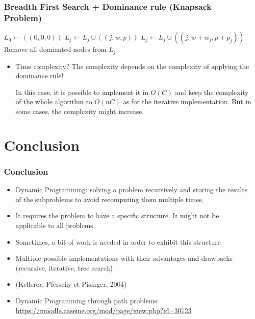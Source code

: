 \documentclass{beamer}
\begin{document}
\begin{frame}
  \frametitle{Breadth First Search + Dominance rule (Knapsack Problem)}

  \begin{algorithmic}
    \State $L_0 \gets ((0, 0, 0))$
    \State $L_j \gets L_j \cup ((j, w, p)) $
    \State $L_j \gets L_j \cup ((j, w + w_j, p + p_j))$
    \EndIf
    \EndFor
    \State \alert{Remove all dominated nodes from $L_j$}
    \EndFor
    \EndProcedure
  \end{algorithmic}

  \begin{itemize}
    \item \pause Time complexity? \pause The complexity depends on the complexity of applying the dominance rule!

  In this case, it is possible to implement it in $O(C)$ and keep the complexity of the whole algorithm to $O(nC)$ as for the iterative implementation. But in some cases, the complexity might increase.
  \end{itemize}
\end{frame}

\section{Conclusion}

\begin{frame}
  \frametitle{Conclusion}

  \begin{itemize}
    \item Dynamic Programming: solving a problem recursively and storing the results of the subproblems to avoid recomputing them multiple times.
    \item It requires the problem to have a specific structure. It might not be applicable to all problems.
    \item Sometimes, a bit of work is needed in order to exhibit this structure
    \item Multiple possible implementations with their advantages and drawbacks (recursive, iterative, tree search)
    \item {} (Kellerer, Pferschy et Pisinger, 2004)
    \item Dynamic Programming through path problems: \url{https://moodle.caseine.org/mod/page/view.php?id=30723}
  \end{itemize}

\end{frame}

\maketitle
\end{document}

